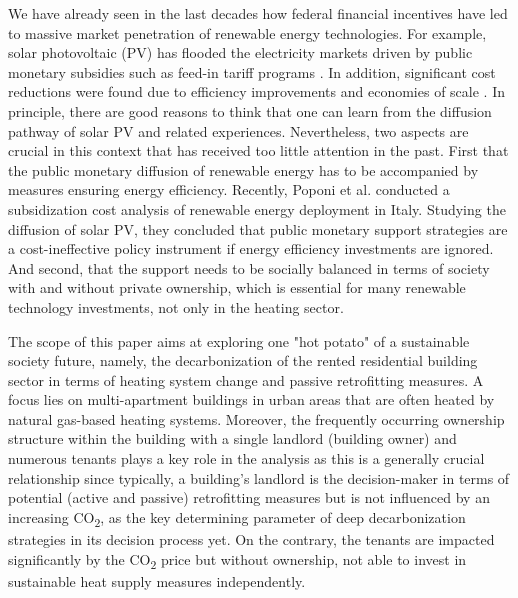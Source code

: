We have already seen in the last decades how federal financial incentives have led to massive market penetration of renewable energy technologies. For example, solar photovoltaic (PV) has flooded the electricity markets driven by public monetary subsidies such as feed-in tariff programs \cite{hoppmann2014compulsive}. In addition, significant cost reductions were found due to efficiency improvements and economies of scale \cite{haas2011historical}. In principle, there are good reasons to think that one can learn from the diffusion pathway of solar PV and related experiences. Nevertheless, two aspects are crucial in this context that has received too little attention in the past. First that the public monetary diffusion of renewable energy has to be accompanied by measures ensuring energy efficiency. Recently, Poponi et al. \cite{poponi2021subsidisation} conducted a subsidization cost analysis of renewable energy deployment in Italy. Studying the diffusion of solar PV, they concluded that public monetary support strategies are a cost-ineffective policy instrument if energy efficiency investments are ignored. And second, that the support needs to be socially balanced in terms of society with and without private ownership, which is essential for many renewable technology investments, not only in the heating sector.\vspace{0.5cm}

The scope of this paper aims at exploring one "hot potato" of a sustainable society future, namely, the decarbonization of the rented residential building sector in terms of heating system change and passive retrofitting measures. A focus lies on multi-apartment buildings in urban areas that are often heated by natural gas-based heating systems. Moreover, the frequently occurring ownership structure within the building with a single landlord (building owner) and numerous tenants plays a key role in the analysis as this is a generally crucial relationship since typically, a building's landlord is the decision-maker in terms of potential (active and passive) retrofitting measures but is not influenced by an increasing CO\textsubscript{2}, as the key determining parameter of deep decarbonization strategies in its decision process yet. On the contrary, the tenants are impacted significantly by the CO\textsubscript{2} price but without ownership, not able to invest in sustainable heat supply measures independently.\vspace{0.5cm}

